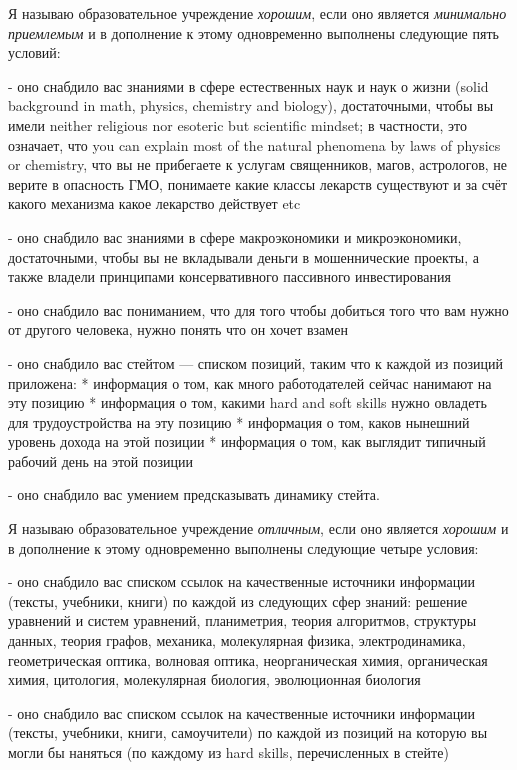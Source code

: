 \documentclass[11pt]{article}
\theoremstyle{remark}
\theoremstyle{definition}
\begin{document}
\begin{enumerate}
Я называю образовательное учреждение \textit{хорошим}, если оно является \textit{минимально приемлемым} и в дополнение к этому одновременно выполнены следующие пять условий:

- оно снабдило вас знаниями в сфере естественных наук и наук о жизни (solid background in math, physics, chemistry and biology), достаточными, чтобы вы имели neither religious nor esoteric but scientific mindset; в частности, это означает, что you can explain most of the natural phenomena by laws of physics or chemistry, что вы не прибегаете к услугам священников, магов, астрологов, не верите в опасность ГМО, понимаете какие классы лекарств существуют и за счёт какого механизма какое лекарство действует etc



- оно снабдило вас знаниями в сфере макроэкономики и микроэкономики, достаточными, чтобы вы не вкладывали деньги в мошеннические проекты, а также владели принципами консервативного пассивного инвестирования


- оно снабдило вас пониманием, что для того чтобы добиться того что вам нужно от другого человека, нужно понять что он хочет взамен


- оно снабдило вас стейтом --- списком позиций, таким что к каждой из позиций приложена:
* информация о том, как много работодателей сейчас нанимают на эту позицию
* информация о том, какими hard and soft skills нужно овладеть для трудоустройства на эту позицию 
* информация о том, каков нынешний уровень дохода на этой позиции
* информация о том, как выглядит типичный рабочий день на этой позиции

- оно снабдило вас умением предсказывать динамику стейта.


Я называю образовательное учреждение \textit{отличным}, если оно является \textit{хорошим} и в дополнение к этому одновременно выполнены следующие четыре условия:

- оно снабдило вас списком ссылок на качественные источники информации (тексты, учебники, книги) по каждой из следующих сфер знаний: решение уравнений и систем уравнений, планиметрия, теория алгоритмов, структуры данных, теория графов, механика, молекулярная физика, электродинамика, геометрическая оптика, волновая оптика, неорганическая химия, органическая химия, цитология, молекулярная биология, эволюционная биология

- оно снабдило вас списком ссылок на качественные источники информации (тексты, учебники, книги, самоучители) по каждой из позиций на которую вы могли бы наняться (по каждому из hard skills, перечисленных в стейте) %


\end{enumerate}
\end{document}
